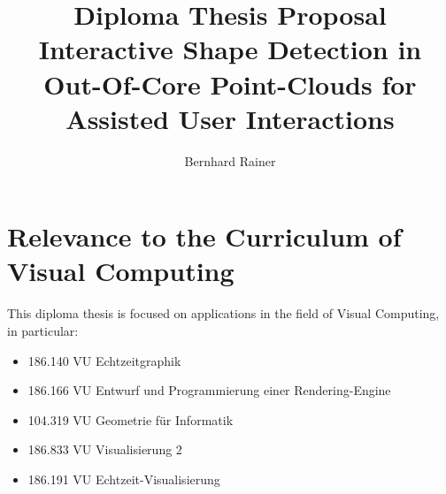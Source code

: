 \documentclass[]{article}
\title{\textbf{Diploma Thesis Proposal}\\
	\Large Interactive Shape Detection in Out-Of-Core Point-Clouds for Assisted User Interactions}
\author{Bernhard Rainer}
\begin{document}
\maketitle







\newpage
\section{Relevance to the Curriculum of Visual Computing}

This diploma thesis is focused on applications in the field of Visual Computing, in particular: 

\begin{itemize}
	\item 186.140 VU Echtzeitgraphik
	\item 186.166 VU Entwurf und Programmierung einer Rendering-Engine
	\item 104.319 VU Geometrie f\"ur Informatik
	\item 186.833 VU Visualisierung 2
	\item 186.191 VU Echtzeit-Visualisierung
	
\end{itemize}



\end{document}
